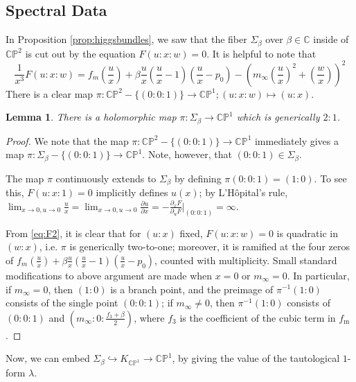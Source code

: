 \documentclass[12pt,letterpaper,reqno]{amsart}
\def\mathbf#1{#1}%
\newtheorem{lem}[thm]{Lemma}
\theoremstyle{remark}
\theoremstyle{definition}
\numberwithin{thm}{section}
\numberwithin{equation}{section}
\numberwithin{figure}{section}
\newcommand{\CP}{\ensuremath{\mathbb {CP}}}
\begin{document}
\subsection{Spectral Data} 


 In Proposition \ref{prop:higgsbundles}, we saw that the fiber $\Sigma_\beta$ over $\beta \in \mathbb{C}$ inside of $\mathbb{CP}^2$ is cut out by the equation $F(u:x:w)=0$. It is helpful to note that 
\begin{equation} \frac{1}{x^3} F(u:x:w)= f_{\mathbf{m}}\left(\frac{u}{x}\right) + \beta \frac{u}{x}\left(\frac{u}{x}-1\right)\left(\frac{u}{x} - p_0\right) -\left(m_\infty \left(\frac{u}{x}\right)^2  + \left(\frac{w}{x}\right)\right)^2 \label{eq:F2}\end{equation}
 There is a clear map $\pi: \mathbb{CP}^2-\{(0:0:1)\} \to \mathbb{CP}^1; (u:x:w) \mapsto (u:x)$.
 \begin{lem}\label{lem:pi}
 There is a holomorphic map $\pi:\Sigma_\beta \to \CP^1$ which is generically $2:1$.
 \end{lem}
 \begin{proof}
 We note that the map $\pi: \mathbb{CP}^2-\{(0:0:1)\} \to \mathbb{CP}^1$ immediately gives a map $\pi: \Sigma_\beta-\{(0:0:1)\} \to \CP^1$. Note, however, that $(0:0:1) \in \Sigma_\beta$. 
 
 The map $\pi$ continuously extends to $\Sigma_\beta$ by defining $\pi(0:0:1)=(1:0)$. To see this, $F(u:x:1)=0$ implicitly defines $u(x)$; by L'H\^{o}pital's rule, $\lim_{x \to 0, u \to 0}\frac{u}{x} = \lim_{x \to 0, u\to 0} \frac{\partial u}{\partial x} = -  \frac{\partial_x F}{\partial_u F}|_{(0:0:1)}=\infty$.


 From \eqref{eq:F2}, it is clear that for $(u:x)$ fixed, $F(u:x:w)=0$ is quadratic in $(w:x)$, i.e. $\pi$ is generically two-to-one; moreover, it is ramified at the four zeros of $f_{\mathbf{m}}(\frac{u}{x}) + \beta \frac{u}{x}(\frac{u}{x}-1)(\frac{u}{x} - p_0)$, counted with multiplicity. Small standard modifications to above argument are made when $x=0$ or $m_\infty = 0$. In particular, if $m_\infty=0$, then $(1:0)$ is a branch point, and the preimage of $\pi^{-1}(1:0)$ consists of the single point $(0:0:1)$; if $m_\infty \neq 0$, then $\pi^{-1}(1:0)$ consists of $(0:0:1)$ and $(m_\infty: 0: \frac{f_3+\beta}{2})$, where $f_3$ is the coefficient of the cubic term in $f_{\mathrm{m}}$.
 \end{proof}

 Now, we can embed $\Sigma_\beta \hookrightarrow K_{\CP^1} \to \CP^1$, by giving the value of the tautological $1$-form $\lambda$.
\end{document}
